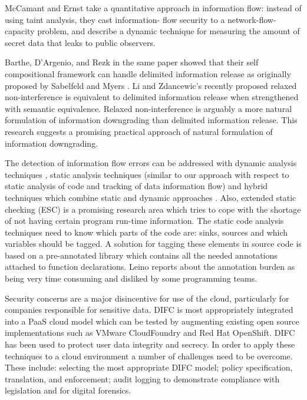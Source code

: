 McCamant and Ernst \cite{ref_101_mccamant2008quantitative} take a quantitative approach in information
flow: instead of using taint analysis, they cast information-
flow security to a network-flow-capacity problem, and describe a
dynamic technique for measuring the amount of secret data that
leaks to public observers.

Barthe, D'Argenio, and Rezk in the same paper showed that their self compositional framework can handle delimited information release as originally proposed by Sabelfeld and Myers \cite{ref_72_sabelfeld2004model}. Li and Zdancewic's
recently proposed relaxed non-interference \cite{ref_73_li2005downgrading} is equivalent to delimited information release when strengthened with semantic equivalence. Relaxed non-interference is arguably a more natural formulation of information downgrading than delimited
information release. This research suggests a promising practical approach of natural formulation of information downgrading.


The detection of information flow errors can be
addressed with dynamic analysis techniques \cite{ref_44_avgerinos:aeg,ref_43_fenton:memoryless,ref_42_sabelfeld:dynamic},
static analysis techniques \cite{ref_41_guarnieri:security,ref_40_myers:jflow,ref_39_simonet:report,ref_38_volpano:sound,ref_37_xiao:transparent} (similar
to our approach with respect to static analysis of code and
tracking of data information flow) and hybrid techniques which
combine static and dynamic approaches \cite{ref_36_moore:static}. Also, extended
static checking \cite{ref_35_david:extended} (ESC) is a promising research area which
tries to cope with the shortage of not having certain program
run-time information.
The static code analysis techniques need to know which
parts of the code are: sinks, sources and which variables
should be tagged. A solution for tagging these elements in
source code is based on a pre-annotated library which contains
all the needed annotations attached to function declarations.
Leino \cite{ref_34_leino:10years} reports about the annotation burden as being very
time consuming and disliked by some programming teams.

Security concerns are a major disincentive for use of the
cloud, particularly for companies responsible for sensitive
data. DIFC \cite{ref_74_bacon2014information} is most appropriately integrated into a PaaS cloud model which can be tested by augmenting
existing open source implementations such as VMware CloudFoundry
and Red Hat OpenShift. DIFC has been used to protect user
data integrity and secrecy. In order to apply these techniques
to a cloud environment a number of challenges need to be
overcome. These include: selecting the most appropriate DIFC
model; policy specification, translation, and enforcement; audit
logging to demonstrate compliance with legislation and for
digital forensics.

